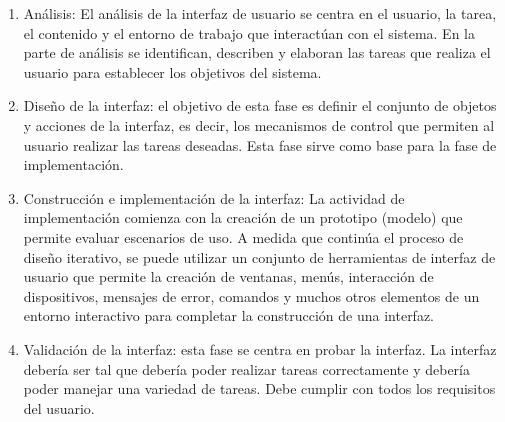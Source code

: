 \begin{enumerate}
\item Análisis: El análisis de la interfaz de usuario se centra en el usuario, la tarea, el contenido y el entorno de trabajo que interactúan con el sistema. En la parte de análisis se identifican, describen y elaboran las tareas que realiza el usuario para establecer los objetivos del sistema.
\item Diseño de la interfaz: el objetivo de esta fase es definir el conjunto de objetos y acciones de la interfaz, es decir, los mecanismos de control que permiten al usuario realizar las tareas deseadas. Esta fase sirve como base para la fase de implementación.
\item Construcción e implementación de la interfaz: La actividad de implementación comienza con la creación de un prototipo (modelo) que permite evaluar escenarios de uso. A medida que continúa el proceso de diseño iterativo, se puede utilizar un conjunto de herramientas de interfaz de usuario que permite la creación de ventanas, menús, interacción de dispositivos, mensajes de error, comandos y muchos otros elementos de un entorno interactivo para completar la construcción de una interfaz.
\item Validación de la interfaz: esta fase se centra en probar la interfaz. La interfaz debería ser tal que debería poder realizar tareas correctamente y debería poder manejar una variedad de tareas. Debe cumplir con todos los requisitos del usuario. 
\end{enumerate}

